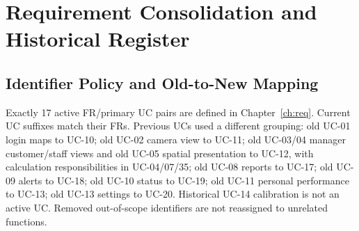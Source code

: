 \chapter{Requirement Consolidation and Historical Register}
\label{app:req-history}
\section{Identifier Policy and Old-to-New Mapping}
Exactly 17 active FR/primary UC pairs are defined in Chapter~\ref{ch:req}. Current UC suffixes match their FRs. Previous UCs used a different grouping: old UC-01 login maps to UC-10; old UC-02 camera view to UC-11; old UC-03/04 manager customer/staff views and old UC-05 spatial presentation to UC-12, with calculation responsibilities in UC-04/07/35; old UC-08 reports to UC-17; old UC-09 alerts to UC-18; old UC-10 status to UC-19; old UC-11 personal performance to UC-13; old UC-13 settings to UC-20. Historical UC-14 calibration is not an active UC. Removed out-of-scope identifiers are not reassigned to unrelated functions.

